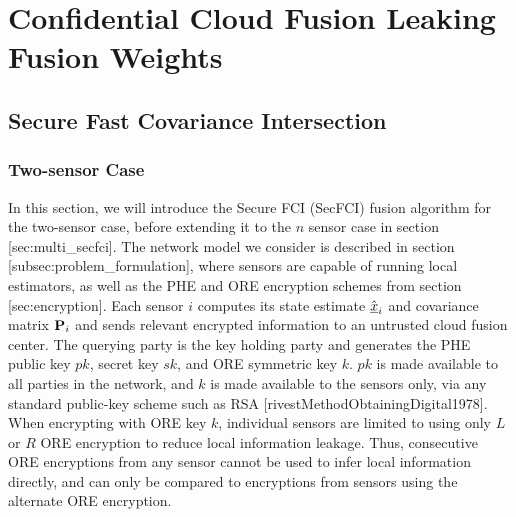\section{Confidential Cloud Fusion Leaking Fusion Weights}

% 
% 

\subsection{Secure Fast Covariance Intersection}

% 
% 

\subsubsection{Two-sensor Case} \label{sec:secfci}
In this section, we will introduce the Secure FCI (SecFCI) fusion algorithm for the two-sensor case, before extending it to the $n$ sensor case in section [sec:multi\_secfci]. The network model we consider is described in section [subsec:problem\_formulation], where sensors are capable of running local estimators, as well as the PHE and ORE encryption schemes from section [sec:encryption]. Each sensor $i$ computes its state estimate $\hat{{\underline{x}}}_i$ and covariance matrix ${{\mathbf{P}}}_i$ and sends relevant encrypted information to an untrusted cloud fusion center. The querying party is the key holding party and generates the PHE public key $pk$, secret key $sk$, and ORE symmetric key $k$. $pk$ is made available to all parties in the network, and $k$ is made available to the sensors only, via any standard public-key scheme such as RSA [rivestMethodObtainingDigital1978]. When encrypting with ORE key $k$, individual sensors are limited to using only $L$ or $R$ ORE encryption to reduce local information leakage. Thus, consecutive ORE encryptions from any sensor cannot be used to infer local information directly, and can only be compared to encryptions from sensors using the alternate ORE encryption.

